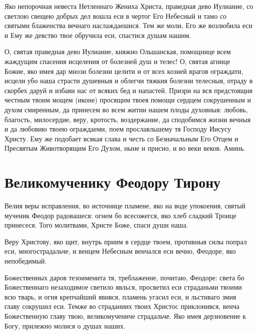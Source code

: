 

Яко непорочная невеста Нетленнаго Жениха Христа, праведная дево Иулиание,  со светлою свещею добрых дел вошла еси в чертог Его Небесный и тамо со святыми блаженства вечнаго наслаждаешися. Тем же моли, Его же возлюбила еси и Ему же девство твое обручила еси, спастися душам нашим.




О, святая праведная дево Иулиание, княжно Ольшанская, помощнице всем жаждущим спасения исцеления от болезней душ и телес! О, святая агнице Божие, яко имея дар мнози болезни целити и от всех козней врагов ограждати, исцели убо наша страсти душевныя и облегчи тяжкия болезни телесныя, отраду в скорбех даруй и избави нас от всяких бед и напастей. Призри на вся предстоящия честным твоим мощем (иконе) просящим твоея помощи сердцем сокрушенным и духом смиренным, да принесем во всем житии нашем плоды духовныя: любовь, благость, милосердие, веру, кротость, воздержание, да сподобимся жизни вечныя и да любовию твоею ограждаеми, поем прославльшему тя Господу Иисусу Христу. Ему же подобает всякая слава и честь со Безначальным Его Отцем и Пресвятым Животворящим Его Духом, ныне и присно, и во веки веков. Аминь.
\mychapterending


 

\section{Великомученику Феодору Тирону}
 




Велия веры исправления, во источнице пламене, яко на воде упокоения, святый мученик Феодор радовашеся: огнем бо всесожегся, яко хлеб сладкий Троице принесеся. Того молитвами, Христе Боже, спаси души наша.




Веру Христову, яко щит, внутрь приим в сердце твоем, противныя силы попрал еси, многострадальче, и венцем Небесным венчался еси вечно, Феодоре, яко непобедимый.




Божественных даров тезоименита тя, треблаженне, почитаю, Феодоре: света бо Божественнаго незаходимое светило явлься, просветил еси страданьми твоими всю тварь, и огня крепчайший явився, пламень угасил еси, и льстиваго змия главу сокрушил еси. Темже во страданиих твоих Христос приклонився, венча Божественную главу твою, великомучениче страдальче. Яко имея дерзновение к Богу, прилежно молися о душах наших.


